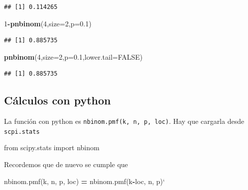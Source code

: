 \documentclass[]{book}
\newenvironment{Shaded}{\begin{snugshade}}{\end{snugshade}}
\newcommand{\DataTypeTok}[1]{\textcolor[rgb]{0.13,0.29,0.53}{#1}}
\newcommand{\DecValTok}[1]{\textcolor[rgb]{0.00,0.00,0.81}{#1}}
\newcommand{\FloatTok}[1]{\textcolor[rgb]{0.00,0.00,0.81}{#1}}
\newcommand{\ImportTok}[1]{#1}
\newcommand{\KeywordTok}[1]{\textcolor[rgb]{0.13,0.29,0.53}{\textbf{#1}}}
\newcommand{\NormalTok}[1]{#1}
\newcommand{\OperatorTok}[1]{\textcolor[rgb]{0.81,0.36,0.00}{\textbf{#1}}}
\newcommand{\OtherTok}[1]{\textcolor[rgb]{0.56,0.35,0.01}{#1}}
\begin{document}
\begin{verbatim}
## [1] 0.114265
\end{verbatim}

\begin{Shaded}
\begin{Highlighting}[]
\DecValTok{1}\OperatorTok{-}\KeywordTok{pnbinom}\NormalTok{(}\DecValTok{4}\NormalTok{,}\DataTypeTok{size=}\DecValTok{2}\NormalTok{,}\DataTypeTok{p=}\FloatTok{0.1}\NormalTok{)}
\end{Highlighting}
\end{Shaded}

\begin{verbatim}
## [1] 0.885735
\end{verbatim}

\begin{Shaded}
\begin{Highlighting}[]
\KeywordTok{pnbinom}\NormalTok{(}\DecValTok{4}\NormalTok{,}\DataTypeTok{size=}\DecValTok{2}\NormalTok{,}\DataTypeTok{p=}\FloatTok{0.1}\NormalTok{,}\DataTypeTok{lower.tail=}\OtherTok{FALSE}\NormalTok{)}
\end{Highlighting}
\end{Shaded}

\begin{verbatim}
## [1] 0.885735
\end{verbatim}

\hypertarget{cuxe1lculos-con-python-5}{%
\subsection{Cálculos con python}\label{cuxe1lculos-con-python-5}}

La función con python es \texttt{nbinom.pmf(k,\ n,\ p,\ loc)}. Hay que cargarla desde \texttt{scpi.stats}

\begin{Shaded}
\begin{Highlighting}[]
\ImportTok{from}\NormalTok{ scipy.stats }\ImportTok{import}\NormalTok{ nbinom}
\end{Highlighting}
\end{Shaded}

Recordemos que de nuevo se cumple que

\begin{Shaded}
\begin{Highlighting}[]
\NormalTok{nbinom.pmf(k, n, p, loc) }\OperatorTok{=}\NormalTok{ nbinom.pmf(k}\OperatorTok{-}\NormalTok{loc, n, p)`}
\end{Highlighting}
\end{Shaded}
\end{document}
